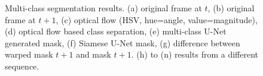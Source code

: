 \documentclass{bmvc2k}
\begin{document}
\begin{figure}[h]
\begin{adjustbox}{width=.9\textwidth}
\end{adjustbox}
\begin{adjustbox}{width=.9\textwidth}
	\caption{
		Multi-class segmentation results.  (a) original frame at $t$, (b) original frame at $t+1$, (c) optical flow (HSV, hue=angle, value=magnitude), (d) optical flow based class separation,  (e) multi-class U-Net generated mask, (f) Siamese U-Net mask, (g) difference between warped mask $t+1$ and mask $t+1$. (h) to (n) results from a different sequence.}
	\label{Multi_Seg}
\end{adjustbox}
\end{figure}
\end{document}
